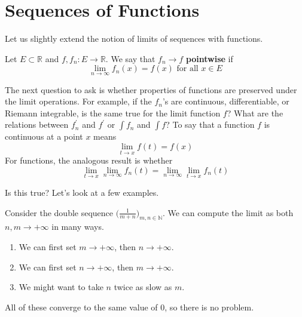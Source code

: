 \section{Sequences of Functions}

  Let us slightly extend the notion of limits of sequences with functions. 

  \begin{definition}
    \label{def:pointwise-convergence}
    Let $E \subset \mathbb{R}$ and $f, f_n : E \to \mathbb{R}$. We say that $f_n \to f$ \textbf{pointwise} if 
    \begin{equation}
      \lim_{n \to \infty} f_n (x) = f(x) \text{ for all } x \in E
    \end{equation}
  \end{definition}

  The next question to ask is whether properties of functions are preserved under the limit operations. For example, if the $f_n$'s are continuous, differentiable, or Riemann integrable, is the same true for the limit function $f$? What are the relations between $f_n^\prime$ and $f^\prime$ or $\int f_n$ and $\int f$? To say that a function $f$ is continuous at a point $x$ means 
  \begin{equation}
    \lim_{t \to x} f(t) = f(x)
  \end{equation}
  For functions, the analogous result is whether 
  \begin{equation}
    \lim_{t \to x} \lim_{n \to \infty} f_n (t) = \lim_{n \to \infty} \lim_{t \to x} f_n (t)
  \end{equation}

  Is this true? Let's look at a few examples. 

  \begin{example}
    Consider the double sequence $\big( \frac{1}{m + n} \big)_{m, n \in \mathbb{N}}$. We can compute the limit as both $n, m \to +\infty$ in many ways. 
    \begin{enumerate}
      \item We can first set $m \to +\infty$, then $n \to +\infty$. 
      \item We can first set $n \to +\infty$, then $m \to +\infty$. 
      \item We might want to take $n$ twice as slow as $m$. 
    \end{enumerate}
    All of these converge to the same value of $0$, so there is no problem. 
  \end{example}

